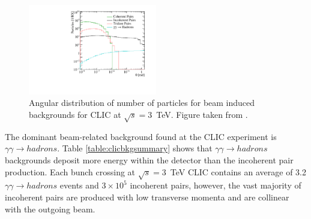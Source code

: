 \begin{figure}[h!]
\includegraphics[width=0.5\textwidth]{Introduction/Plots/CDRPlots/BackgroundAngleCut.pdf}
\caption[Angular distribution of number of particles for beam induced backgrounds for CLIC at $\sqrt{s}=3$~TeV.  Figure taken from \cite{Linssen:2012hp}.]{Angular distribution of number of particles for beam induced backgrounds for CLIC at $\sqrt{s}=3$~TeV.  Figure taken from \cite{Linssen:2012hp}.}
\label{fig:backgroundangle}
\end{figure}

The dominant beam-related background found at the CLIC experiment is $\gamma\gamma \rightarrow hadrons$.  Table \ref{table:clicbkgsummary} shows that $\gamma\gamma \rightarrow hadrons$ backgrounds deposit more energy within the detector than the incoherent pair production.  Each bunch crossing at $\sqrt{s}=3$~TeV CLIC contains an average of 3.2 $\gamma\gamma \rightarrow hadrons$ events and $3\times10^{5}$ incoherent pairs, however, the vast majority of incoherent pairs are produced with low transverse momenta and are collinear with the outgoing beam.

